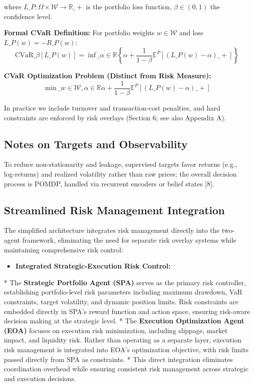 \documentclass[11pt,a4paper]{article}
\begin{document}
where $L\_P: \Omega \times \mathcal{W} \to \mathbb{R}\_+$ is the portfolio loss function, $\beta\in(0,1)$ the confidence level.

\textbf{Formal CVaR Definition:}
For portfolio weights $w \in \mathcal{W}$ and loss $L\_P(w) = -R\_P(w)$:
\begin{equation}
\text{CVaR}\_\beta[L\_P(w)] = \inf\_{\alpha \in \mathbb{R}} \left\{\alpha + \frac{1}{1-\beta}\mathbb{E}^P[(L\_P(w) - \alpha)\_+]\right\}
\end{equation}

\textbf{CVaR Optimization Problem (Distinct from Risk Measure):}
\begin{equation}
\min\_{w \in \mathcal{W}, \alpha \in \mathbb{R}} \alpha + \frac{1}{1-\beta}\mathbb{E}^P[(L\_P(w) - \alpha)\_+]
\end{equation}

In practice we include turnover and transaction-cost penalties, and hard constraints are enforced by risk overlays (Section 6; see also Appendix A).

\subsection{Notes on Targets and Observability}

To reduce non-stationarity and leakage, supervised targets favor returns (e.g., log-returns) and realized volatility rather than raw prices; the overall decision process is POMDP, handled via recurrent encoders or belief states [8].

\subsection{Streamlined Risk Management Integration}

The simplified architecture integrates risk management directly into the two-agent framework, eliminating the need for separate risk overlay systems while maintaining comprehensive risk control:

\begin{itemize}
\item   \textbf{Integrated Strategic-Execution Risk Control:}
\end{itemize}
    *   The \textbf{Strategic Portfolio Agent (SPA)} serves as the primary risk controller, establishing portfolio-level risk parameters including maximum drawdown, VaR constraints, target volatility, and dynamic position limits. Risk constraints are embedded directly in SPA's reward function and action space, ensuring risk-aware decision making at the strategic level.
    *   The \textbf{Execution Optimization Agent (EOA)} focuses on execution risk minimization, including slippage, market impact, and liquidity risk. Rather than operating as a separate layer, execution risk management is integrated into EOA's optimization objective, with risk limits passed directly from SPA as constraints.
    *   This direct integration eliminates coordination overhead while ensuring consistent risk management across strategic and execution decisions.
\end{document}
